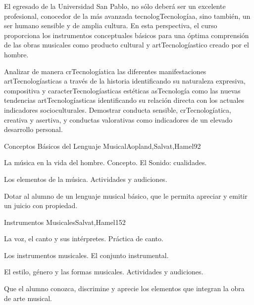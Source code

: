 \begin{syllabus}


\begin{justification}
El egresado de la Universidad San Pablo, no sólo deberá ser un excelente profesional, conocedor de la más avanzada tecnologTecnologíaa, sino también, un ser humano sensible y de amplia cultura. En esta perspectiva, el curso proporciona los instrumentos conceptuales básicos para una óptima comprensión de las obras musicales como producto cultural y artTecnologíastico creado por el hombre.
\end{justification}

\begin{goals}
\item Analizar de manera crTecnologíatica las diferentes manifestaciones artTecnologíasticas a través de la historia identificando su naturaleza expresiva, compositiva y caracterTecnologíasticas estéticas asTecnología como las nuevas tendencias artTecnologíasticas identificando su relación directa con los actuales indicadores socioculturales. Demostrar conducta sensible, crTecnologíatica, creativa y asertiva, y conductas valorativas como indicadores de un elevado desarrollo personal.
\end{goals}

\begin{outcomes}
\end{outcomes}

\begin{unit}{Conceptos Básicos del Lenguaje Musical}{Aopland,Salvat,Hamel}{9}{2}
\begin{topics}
	\item La música en la vida del hombre. Concepto. El Sonido: cualidades.
	\item Los elementos de la música. Actividades y audiciones.
\end{topics}
\begin{unitgoals}
	\item Dotar al alumno de un lenguaje musical básico, que le permita apreciar y emitir un juicio con propiedad.
\end{unitgoals}
\end{unit}

\begin{unit}{Instrumentos Musicales}{Salvat,Hamel}{15}{2}
\begin{topics}
	\item La voz, el canto y sus intérpretes. Práctica de canto.
	\item Los instrumentos musicales. El conjunto instrumental.
	\item El estilo, género y las formas musicales. Actividades y audiciones.
\end{topics}
\begin{unitgoals}
	\item Que el alumno conozca, discrimine y aprecie los elementos que integran la obra de arte musical.
\end{unitgoals}
\end{unit}


\end{syllabus}
